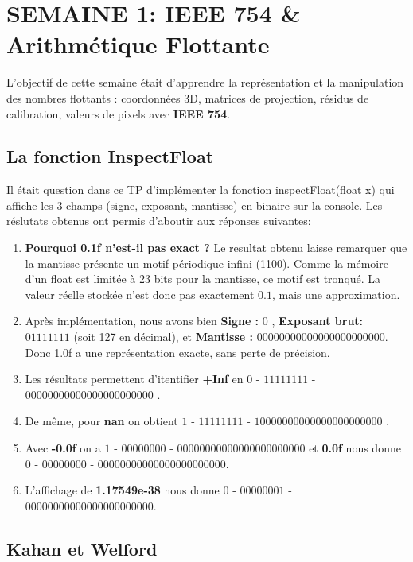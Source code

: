 \documentclass[12pt,a4paper]{report}
\begin{document}
\chapter{SEMAINE 1: IEEE 754 & Arithmétique Flottante}

L'objectif de cette semaine était d'apprendre la représentation et la manipulation des nombres flottants : coordonnées 3D, matrices de projection, résidus de calibration, valeurs de pixels avec \textbf{IEEE 754}.

\section{La fonction InspectFloat}

Il était question dans ce TP d'implémenter la fonction inspectFloat(float x) qui affiche les 3 champs (signe, exposant, mantisse) en binaire sur la console. Les réslutats obtenus ont permis d'aboutir aux réponses suivantes:

\begin{enumerate}
    \item \textbf{Pourquoi 0.1f n'est-il pas exact ? } Le resultat obtenu laisse remarquer que la mantisse présente un motif périodique infini (1100). Comme la mémoire d'un float est limitée à 23 bits pour la mantisse, ce motif est tronqué. La valeur réelle stockée n'est donc pas exactement $0.1$, mais une approximation.
    \item Après implémentation, nous avons bien \textbf{Signe :} $0$ , \textbf{Exposant brut: } $01111111$ (soit 127 en décimal), et \textbf{Mantisse :} $00000000000000000000000$. Donc 1.0f a une représentation exacte, sans perte de précision.
    \item Les résultats permettent d'itentifier \textbf{+Inf} en $0$ - $11111111$ - $00000000000000000000000$ .
    \item De même, pour \textbf{nan} on obtient $1$ - $11111111$ - $10000000000000000000000$ .
    \item Avec \textbf{-0.0f} on a $1$ - $00000000$ - $00000000000000000000000$ et \textbf{0.0f} nous donne $0$ - $00000000$ - $00000000000000000000000$.
    \item L'affichage de \textbf{1.17549e-38} nous donne $0$ - $00000001$ - $00000000000000000000000$.
\end{enumerate}

\section{Kahan et Welford}
\end{document}
